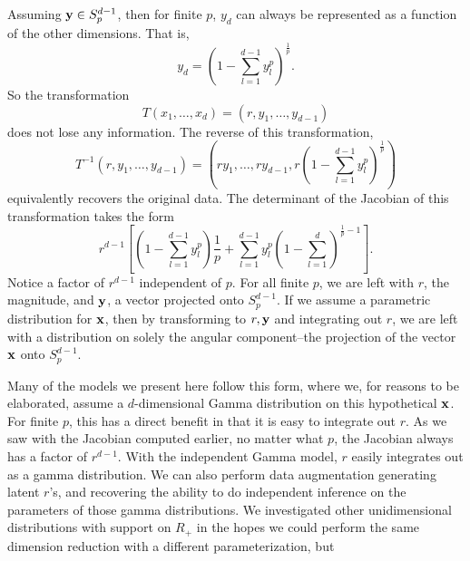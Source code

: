 Assuming ${\bf y} \in S_{p}^{d-1}$, then for finite $p$, $y_d$ can always be represented as a
  function of the other dimensions.  That is,
  \begin{equation*}
    y_d = \left(1 - \sum_{l = 1}^{d-1}y_l^p\right)^{\frac{1}{p}}.
  \end{equation*}
  So the transformation
  \begin{equation*}
    T(x_1,\ldots,x_d) = (r,y_1,\ldots,y_{d-1})
  \end{equation*}
  does not lose any information.  The reverse of this transformation,
  \begin{equation*}
    T^{-1}\left(r,y_1,\ldots,y_{d-1}\right) =
      \left(ry_1,\ldots,ry_{d-1},r\left(1 - {\scriptstyle\sum}_{l = 1}^{d-1}y_l^p\right)^{\frac{1}{p}}\right)
  \end{equation*}
  equivalently recovers the original data.  The determinant of the Jacobian of this transformation
  takes the form
  \begin{equation*}
    r^{d-1}\left[\left(1 - \sum_{l = 1}^{d-1}y_l^p\right)\frac{1}{p} +
        \sum_{l = 1}^{d-1}y_l^p\left(1 - \sum_{l=1}^d\right)^{\frac{1}{p} - 1}\right].
  \end{equation*}
  Notice a factor of $r^{d-1}$ independent of $p$. For all finite $p$, we are left with $r$, the
  magnitude, and ${\bf y}$, a vector projected onto $S_{p}^{d-1}$.  If we assume a parametric
  distribution for ${\bf x}$, then by transforming to $r, {\bf y}$ and integrating out $r$, we are
  left with a distribution on solely the angular component--the projection of the vector ${\bf x}$
  onto $S_{p}^{d-1}$.

Many of the models we present here follow this form, where we, for reasons to be elaborated, assume
  a $d$-dimensional Gamma distribution on this hypothetical ${\bf x}$. For finite $p$, this has a
  direct benefit in that it is easy to integrate out $r$.  As we saw with the Jacobian computed
  earlier, no matter what $p$, the Jacobian always has a factor of $r^{d-1}$.  With the independent
  Gamma model, $r$ easily integrates out as a gamma distribution.  We can also perform data
  augmentation generating latent $r$'s, and recovering the ability to do independent inference on
  the parameters of those gamma distributions.  We investigated other unidimensional distributions
  with support on $R_+$ in the hopes we could perform the same dimension reduction with a different
  parameterization, but 

